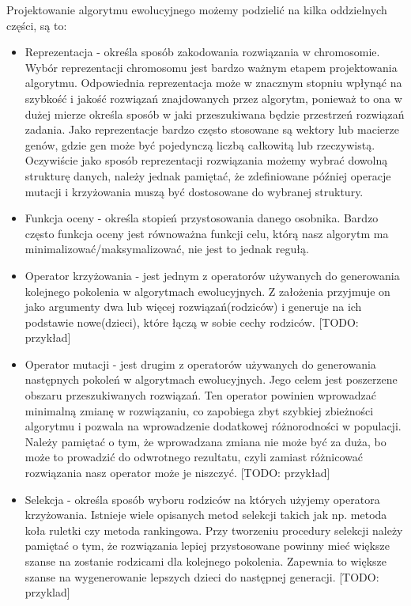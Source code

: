 Projektowanie algorytmu ewolucyjnego możemy podzielić na kilka oddzielnych części, są to: 
\begin{itemize}
    \item Reprezentacja - określa sposób zakodowania rozwiązania w chromosomie. Wybór reprezentacji chromosomu jest bardzo ważnym etapem 
    projektowania algorytmu. Odpowiednia reprezentacja może w znacznym stopniu wpłynąć na szybkość i jakość rozwiązań znajdowanych przez 
    algorytm, ponieważ to ona w dużej mierze określa sposób w jaki przeszukiwana będzie przestrzeń rozwiązań zadania. 
    Jako reprezentacje bardzo często stosowane są wektory lub macierze genów, gdzie gen może być pojedynczą liczbą całkowitą lub rzeczywistą. 
    Oczywiście jako sposób reprezentacji rozwiązania możemy wybrać dowolną strukturę danych, należy jednak pamiętać, że zdefiniowane później 
    operacje mutacji i krzyżowania muszą być dostosowane do wybranej struktury.
    
    \item Funkcja oceny - określa stopień przystosowania danego osobnika. Bardzo często funkcja oceny jest równoważna funkcji celu, którą 
    nasz algorytm ma minimalizować/maksymalizować, nie jest to jednak regułą. 

    \item Operator krzyżowania - jest jednym z operatorów używanych do generowania kolejnego pokolenia w algorytmach ewolucyjnych. Z założenia 
    przyjmuje on jako argumenty dwa lub więcej rozwiązań(rodziców) i generuje na ich podstawie nowe(dzieci), które łączą w sobie cechy rodziców. 
    [TODO: przykład]

    \item Operator mutacji - jest drugim z operatorów używanych do generowania następnych pokoleń w algorytmach ewolucyjnych. Jego celem jest 
    poszerzene obszaru przeszukiwanych rozwiązań. Ten operator powinien wprowadzać minimalną zmianę w rozwiązaniu, co zapobiega zbyt szybkiej 
    zbieżności algorytmu i pozwala na wprowadzenie dodatkowej różnorodności w populacji. Należy pamiętać o tym, że wprowadzana zmiana nie może 
    być za duża, bo może to prowadzić do odwrotnego rezultatu, czyli zamiast różnicować rozwiązania nasz operator może je niszczyć.
    [TODO: przykład]

    \item Selekcja - określa sposób wyboru rodziców na których użyjemy operatora krzyżowania. Istnieje wiele opisanych metod selekcji\cite{SELECTION-METHODS} 
    takich jak np. metoda koła ruletki czy metoda rankingowa. Przy tworzeniu procedury selekcji należy pamiętać 
    o tym, że rozwiązania lepiej przystosowane powinny mieć większe szanse na zostanie rodzicami dla kolejnego pokolenia. Zapewnia to większe 
    szanse na wygenerowanie lepszych dzieci do następnej generacji.
    [TODO: przyklad]


\end{itemize}
